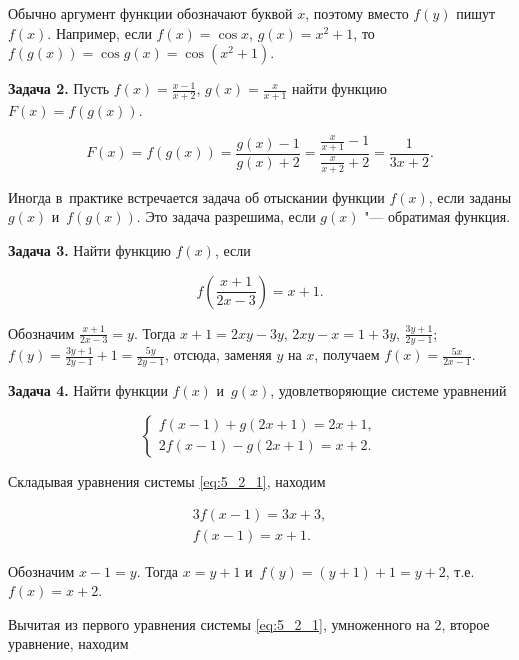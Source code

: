 Обычно аргумент функции обозначают буквой $x$, поэтому вместо $f(y)$ пишут $f(x)$.
Например, если $f(x) = \cos x$, $g(x) = x^{2} + 1$,
то $f(g(x)) = \cos g(x) = \cos (x^{2} + 1)$.

\textbf{Задача 2.}\label{ex:5_2_2} Пусть $\displaystyle f(x) = \frac{x-1}{x+2}$,
$\displaystyle g(x) = \frac{x}{x+1}$ найти функцию $F(x) = f(g(x))$.

\begin{equation*}
F(x) = f(g(x)) = \frac{g(x) - 1}{g(x) + 2} =
\frac{\frac{x}{x+1} - 1}{\frac{x}{x+2} + 2} =
\frac{1}{3x + 2}.
\end{equation*}

Иногда в~практике встречается задача об отыскании функции $f(x)$,
если заданы $g(x)$ и~$f(g(x))$.
Это задача разрешима, если $g(x)$ "--- обратимая функция.

\textbf{Задача 3.}\label{ex:5_2_3} Найти функцию $f(x)$, если

\begin{equation*}
\displaystyle f \left( \frac{x + 1}{2x - 3} \right) = x + 1.
\end{equation*}

Обозначим $\displaystyle \frac{x + 1}{2x - 3} = y$.
Тогда $x + 1 = 2xy - 3y$, $2xy - x = 1 + 3y$, $\displaystyle \frac{3y + 1}{2y - 1}$;
$\displaystyle f(y) = \frac{3y + 1}{2y - 1} + 1 = \frac{5y}{2y - 1}$,
отсюда, заменяя $y$ на $x$, получаем 
$\displaystyle f(x) = \frac{5x}{2x - 1}$.

\textbf{Задача 4.}\label{ex:5_2_4} Найти функции $f(x)$ и~$g(x)$, удовлетворяющие
системе уравнений

\begin{equation}\label{eq:5_2_1}
\begin{cases}
f(x - 1) + g(2x+1) = 2x + 1, \\
2f(x - 1) - g(2x + 1) = x + 2.
\end{cases}
\end{equation}

Складывая уравнения системы \eqref{eq:5_2_1}, находим

\begin{gather*}
3f(x - 1) = 3x + 3, \\
f(x - 1) = x + 1.
\end{gather*}

Обозначим $x - 1 = y$. Тогда $x = y + 1$ и~$f(y) = (y + 1) + 1 = y + 2$,
т.е.\ $f(x) = x + 2$.

Вычитая из первого уравнения системы \eqref{eq:5_2_1}, умноженного на 2,
второе уравнение, находим

